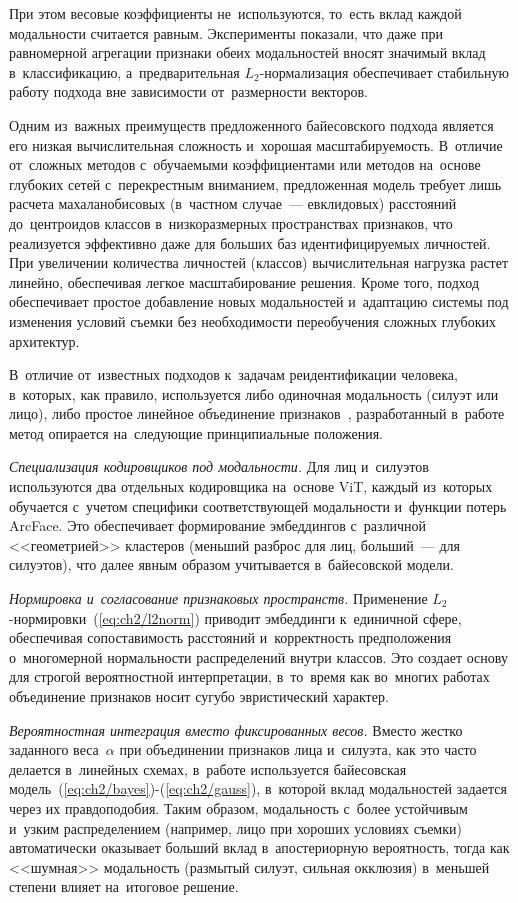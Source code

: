При этом весовые коэффициенты не~используются, то~есть вклад каждой
модальности считается равным. Эксперименты показали, что даже при
равномерной агрегации признаки обеих модальностей вносят значимый
вклад в~классификацию, а~предварительная $L_2$-нормализация
обеспечивает стабильную работу подхода вне зависимости от~размерности
векторов.

Одним из~важных преимуществ предложенного байесовского подхода
является его низкая вычислительная сложность и~хорошая
масштабируемость. В~отличие от~сложных методов с~обучаемыми
коэффициентами или методов на~основе глубоких сетей с~перекрестным
вниманием, предложенная модель требует лишь расчета махаланобисовых
(в~частном случае~--- евклидовых) расстояний до~центроидов классов
в~низкоразмерных пространствах
признаков, что реализуется эффективно даже для больших баз
идентифицируемых личностей. При увеличении количества личностей
(классов) вычислительная нагрузка растет линейно, обеспечивая легкое
масштабирование решения. Кроме того, подход обеспечивает простое
добавление новых модальностей и~адаптацию системы под изменения
условий съемки без необходимости переобучения сложных глубоких
архитектур.

В~отличие от~известных подходов к~задачам реидентификации человека,
в~которых, как правило, используется либо одиночная модальность
(силуэт или лицо), либо простое линейное объединение
признаков~\cite{Khachumov2015face,Koo2018multimodal,Vezzani2013reidsurvey},
разработанный в~работе метод опирается на~следующие принципиальные
положения.

\textit{Специализация кодировщиков под модальности.} Для лиц
и~силуэтов используются два отдельных кодировщика на~основе ViT,
каждый из~которых обучается с~учетом специфики соответствующей
модальности и~функции потерь ArcFace. Это обеспечивает формирование
эмбеддингов с~различной <<геометрией>> кластеров (меньший разброс для
лиц, больший~--- для силуэтов), что далее явным образом учитывается
в~байесовской модели.

\textit{Нормировка и~согласование признаковых пространств.}
Применение $L_2$-нормировки~(\ref{eq:ch2/l2norm}) приводит эмбеддинги
к~единичной сфере, обеспечивая сопоставимость расстояний
и~корректность предположения о~многомерной нормальности распределений
внутри классов. Это создает основу для строгой вероятностной
интерпретации, в~то~время как во~многих работах объединение признаков
носит сугубо эвристический характер.

\textit{Вероятностная интеграция вместо фиксированных весов.} Вместо
жестко заданного веса~$\alpha$ при объединении признаков лица
и~силуэта, как это часто делается в~линейных схемах, в~работе
используется байесовская модель~(\ref{eq:ch2/bayes})-(\ref{eq:ch2/gauss}),
в~которой вклад модальностей задается через их правдоподобия. Таким
образом, модальность с~более устойчивым и~узким распределением
(например, лицо при хороших условиях съемки) автоматически оказывает
больший вклад в~апостериорную вероятность, тогда как <<шумная>>
модальность (размытый силуэт, сильная окклюзия) в~меньшей степени
влияет на~итоговое решение.


